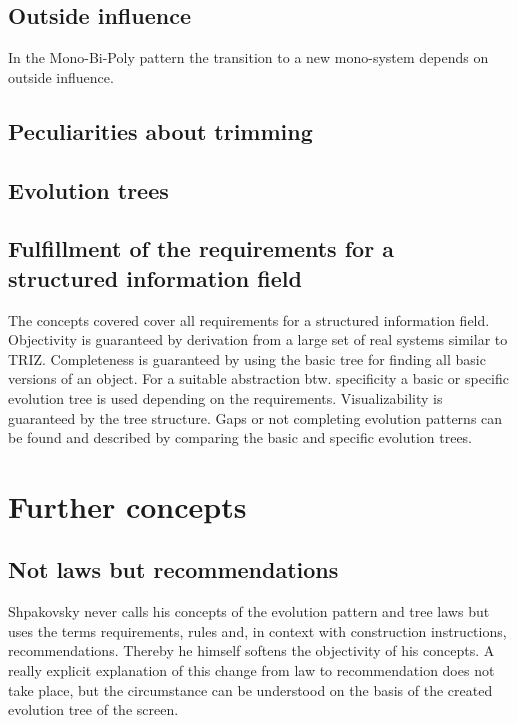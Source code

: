 \documentclass[11pt,a4paper]{article}
\begin{document}
\subsection{Outside influence}

In the Mono-Bi-Poly pattern the transition to a new mono-system depends on outside influence.

\subsection{Peculiarities about trimming}

\subsection{Evolution trees}

\subsection{Fulfillment of the requirements for a structured information field}

The concepts covered cover all requirements for a structured information field. Objectivity is guaranteed by derivation from a large set of real systems similar to TRIZ. Completeness is guaranteed by using the basic tree for finding all basic versions of an object. For a suitable abstraction btw. specificity a basic or specific evolution tree is used depending on the requirements. Visualizability is guaranteed by the tree structure. Gaps or not completing evolution patterns can be found and described by comparing the basic and specific evolution trees.

\section{Further concepts}

\subsection{Not laws but recommendations}

Shpakovsky never calls his concepts of the evolution pattern and tree laws but uses the terms requirements, rules and, in context with construction instructions, recommendations. Thereby he himself softens the objectivity of his concepts. A really explicit explanation of this change from law to recommendation does not take place, but the circumstance can be understood on the basis of the created evolution tree of the screen.
\end{document}
